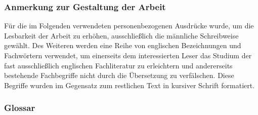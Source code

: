 \subsubsection{Anmerkung zur Gestaltung der Arbeit}
Für die im Folgenden verwendeten personenbezogenen
Ausdrücke wurde, um die Lesbarkeit der Arbeit zu erhöhen,
ausschließlich die männliche Schreibweise gewählt. Des Weiteren werden eine
Reihe von englischen Bezeichnungen und Fachwörtern verwendet, um einerseits dem
interessierten Leser das Studium der fast ausschließlich englischen
Fachliteratur zu erleichtern und andererseits bestehende Fachbegriffe nicht durch die Übersetzung zu verfälschen. Diese Begriffe
wurden im Gegensatz zum restlichen Text in kursiver Schrift formatiert.

\subsubsection{Glossar}
